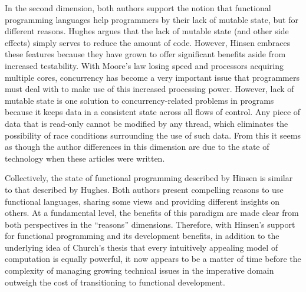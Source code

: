 \documentclass[12pt,letterpaper]{article}
\begin{document}
In the second dimension, both authors support the notion that functional programming languages help programmers
by their lack of mutable state, but for different reasons. Hughes argues that the lack of mutable state (and other side effects)
simply serves to reduce the amount of code. However, Hinsen embraces these features because they have grown to offer significant benefits aside from increased testability. With Moore's law losing speed and processors acquiring multiple cores, concurrency has become a very important issue that programmers must deal with to make use of this increased processing power. However, lack of mutable state is one solution to concurrency-related problems in programs 
because it keeps data in a consistent state across all flows of control. Any piece of data that is read-only cannot be modified by any thread, which eliminates the possibility of race conditions surrounding the use of such data. From this it seems as though the author differences in this dimension are due to the state of technology when these articles were written. 

Collectively, the state of functional programming described by Hinsen is similar to that described by
Hughes. Both authors present compelling reasons to use functional languages, sharing some views and providing 
different insights on others. At a fundamental level, the benefits of this paradigm are made clear from both
perspectives in the ``reasons'' dimensions. Therefore, with Hinsen's support for functional programming and its development benefits, in addition
to the underlying idea of Church's thesis that every intuitively appealing model of computation is equally powerful, it now appears to be a matter of time before the complexity of managing growing 
technical issues in the imperative domain outweigh the cost of transitioning to functional development.




\end{document}
